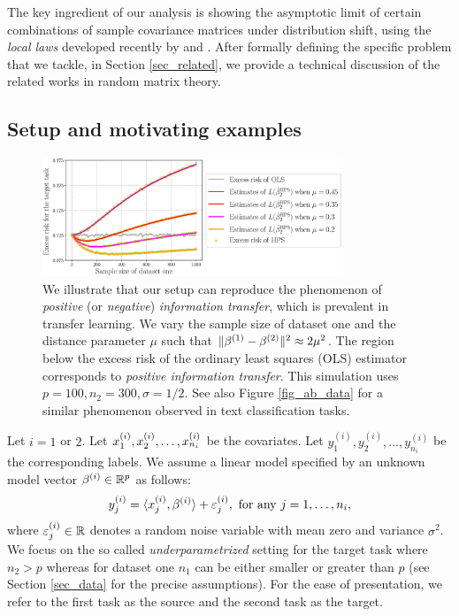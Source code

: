 The key ingredient of our analysis is showing the asymptotic limit of certain combinations of sample covariance matrices under distribution shift, using the \textit{local laws} developed recently by \citet{isotropic} and \citet{BES_free1}.
After formally defining the specific problem that we tackle, in Section \ref{sec_related}, we provide a technical discussion of the related works in random matrix theory.


\subsection{Setup and motivating examples}\label{sec_mot}

\begin{figure}
    \centering
    \includegraphics[width=0.8\textwidth]{figures/motivation.eps}
    \caption{We illustrate that our setup can reproduce the phenomenon of \textit{positive} (or \textit{negative}) \textit{information transfer}, which is prevalent in transfer learning.
    We vary the sample size of dataset one and the distance parameter $\mu$ such that $\norm{\beta^{(1)} - \beta^{(2)}}^2 \approx 2\mu^2$. The region below the excess risk of the ordinary least squares (OLS) estimator corresponds to \textit{positive information transfer}. This simulation uses $p = 100, n_2 = 300, \sigma = 1/2$. See also Figure \ref{fig_ab_data} for a similar phenomenon observed in text classification tasks.}
    \label{fig_motivation}
\end{figure}

Let $i = 1$ or $2$.
Let $x_1^{(i)}, x_2^{\ss (i)}, \dots, x_{n_i}^{(i)}$ be the covariates.
Let $y_1^{(i)}, y_2^{(i)}, \dots, y_{n_i}^{(i)}$ be the corresponding labels.
We assume a linear model specified by an unknown model vector $\beta^{(i)} \in \real^p$ as follows:
\begin{align}
    y_j^{(i)} = \inner{x_j^{(i)}}{\beta^{(i)}} + \varepsilon_j^{(i)}, \text{ for any } j = 1,\dots,n_i, \label{eq_linear}
\end{align}
where $\varepsilon^{(i)}_j\in\real$ denotes a random noise variable with mean zero and variance $\sigma^2$.
We focus on the so called \textit{underparametrized} setting for the target task where $n_2 > p$ whereas for dataset one $n_1$ can be either smaller or greater than $p$  (see Section \ref{sec_data} for the precise assumptions).
For the ease of presentation, we refer to the first task as the source and the second task as the target.

